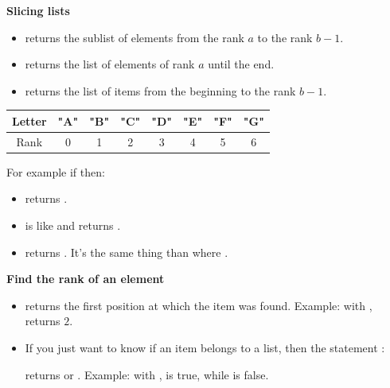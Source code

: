 \documentclass[11pt,class=report,crop=false]{standalone}
\begin{document}
\bigskip
    
\textbf{Slicing lists}
  
  \begin{itemize}
    \item {} \quad returns the sublist of elements from the rank $a$ to the rank $b-1$.
    
    \item {} \quad returns the list of elements of rank $a$ until the end.
      
    \item {} \quad returns the list of items from the beginning to the rank $b-1$.
    

\end{itemize}


\medskip
 \begin{center}
\begin{tabular}{|c|||c|c|c|c|c|c|c|}
\hline
Letter & \textbf{"A"} & \textbf{"B"} & \textbf{"C"} & \textbf{"D"} & \textbf{"E"} & \textbf{"F"} & \textbf{"G"} \\ \hline
Rank & 0 & 1 & 2 & 3 & 4 & 5 & 6 \\ \hline
\end{tabular}
\end{center}
\medskip
  
    For example if  then:
  \begin{itemize}
    \item {} \quad returns \ci{["B","C","D"]}.
    \item {} \quad is like  and returns \ci{["A","B"]}.   
    \item {} \quad returns \ci{["E","F","G"]}.  It's the same thing 
     than  where .
  \end{itemize} 

\bigskip

\textbf{Find the rank of an element} 

\begin{itemize}

    \item   
    returns the first position at which the item was found. Example: with ,
    returns $2$.

  \item If you just want to know if an item belongs to a list, then the statement :  
  
  returns  or .
  Example: with ,
   \og{}\fg{} is true, while \og{}\fg{} is false.
  
\end{itemize}
\end{document}
